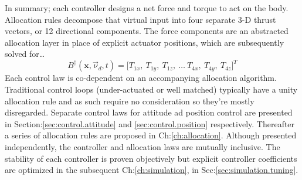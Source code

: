 \par
In summary; each controller designs a net force and torque to act on the body. Allocation rules decompose that virtual input into four separate 3-D thrust vectors, or 12 directional components. The force components are an abstracted allocation layer in place of explicit actuator positions, which are subsequently solved for\ldots
\begin{equation}
B^{\dagger}(\mathbf{x},\vec{\nu}_d,t)=\big[ T_{1x},~T_{1y},~T_{1z},~\ldots~T_{4x},~T_{4y},~T_{4z}\big]^T
\end{equation}
Each control law is co-dependent on an accompanying allocation algorithm. Traditional control loops (under-actuated or well matched) typically have a unity allocation rule and as such require no consideration so they're mostly disregarded. Separate control laws for attitude ad position control are presented in Section:\ref{sec:control.attitude} and \ref{sec:control.position} respectively. Thereafter a series of allocation rules are proposed in Ch:\ref{ch:allocation}. Although presented independently, the controller and allocation laws are mutually inclusive. The stability of each controller is proven objectively but explicit controller coefficients are optimized in the subsequent Ch:\ref{ch:simulation}, in Sec:\ref{sec:simulation.tuning}.
\newpage
